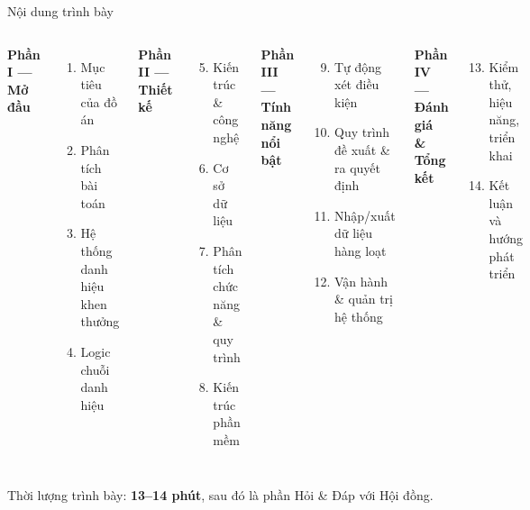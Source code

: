 \documentclass[aspectratio=43,xcolor=table]{beamer}
\newcommand{\highlight}[1]{\textcolor{hustred}{\textbf{#1}}}
\begin{document}
\begin{frame}{Nội dung trình bày}
  \begin{columns}[T,onlytextwidth]
    \textcolor{hustdark}{\textbf{Phần I --- Mở đầu}}
    \begin{enumerate}
      \item Mục tiêu của đồ án
      \item Phân tích bài toán
      \item Hệ thống danh hiệu khen thưởng
      \item Logic chuỗi danh hiệu
    \end{enumerate}
    \vspace{0.3cm}
    \textcolor{hustdark}{\textbf{Phần II --- Thiết kế}}
    \begin{enumerate}\setcounter{enumi}{4}
      \item Kiến trúc \& công nghệ
      \item Cơ sở dữ liệu
      \item Phân tích chức năng \& quy trình
      \item Kiến trúc phần mềm
    \end{enumerate}

    \textcolor{hustdark}{\textbf{Phần III --- Tính năng nổi bật}}
    \begin{enumerate}\setcounter{enumi}{8}
      \item Tự động xét điều kiện
      \item Quy trình đề xuất \& ra quyết định
      \item Nhập/xuất dữ liệu hàng loạt
      \item Vận hành \& quản trị hệ thống
    \end{enumerate}
    \vspace{0.3cm}
    \textcolor{hustdark}{\textbf{Phần IV --- Đánh giá \& Tổng kết}}
    \begin{enumerate}\setcounter{enumi}{12}
      \item Kiểm thử, hiệu năng, triển khai
      \item Kết luận và hướng phát triển
    \end{enumerate}
  \end{columns}

  \vspace{0.4cm}
  \begin{block}{}
    \centering Thời lượng trình bày: \highlight{13--14 phút}, sau đó là phần Hỏi \& Đáp với Hội đồng.
  \end{block}
\end{frame}
\end{document}
